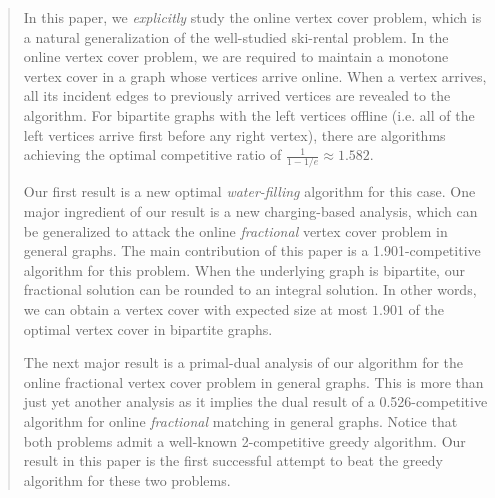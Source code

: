 \documentclass{article}
\newcommand{\yajun}[1]{{\color{red}{#1}}}
\begin{document}
\maketitle
\begin{abstract}


In this paper, we {\em explicitly} study the online vertex cover problem, which is a natural generalization of the well-studied ski-rental problem. In the online vertex cover problem, we are required to maintain a monotone vertex cover in a graph whose vertices arrive online. When a vertex arrives, all its incident edges to previously arrived vertices are revealed to the algorithm. For bipartite graphs with the left vertices offline (i.e. all of the left vertices arrive first before any right vertex), there are algorithms achieving  the optimal competitive ratio of $\frac{1}{1-1/e}\approx 1.582$.

Our first result is a new optimal {\em water-filling} algorithm for this case. One major ingredient of our result is a new charging-based analysis, which can be generalized to attack the
online {\em fractional} vertex cover problem in general graphs. The main contribution of this paper is a 1.901-competitive algorithm for this problem. 
When the underlying graph is bipartite, our fractional solution can be rounded to an integral solution. In other words, we can obtain a vertex cover with expected size at most $1.901$ of the optimal vertex cover in bipartite graphs.

The next major result is a primal-dual analysis of our algorithm for the online fractional vertex cover problem in general graphs.  
This is more than just yet another analysis as it implies the dual result of a 0.526-competitive algorithm for online {\em fractional} matching in general graphs. Notice that both problems admit a well-known 2-competitive greedy algorithm. Our result in this paper is the first successful attempt to beat the greedy algorithm for these two problems. 



\end{abstract}
\end{document}
